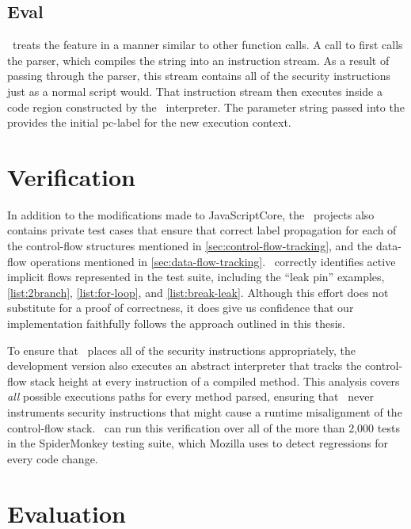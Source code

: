 \subsection{Eval}
\label{sec:eval}
\FlowCore\ treats the  feature in a manner similar to other function calls.
A call to  first calls the parser, which compiles the string into an instruction stream.
As a result of passing through the parser, this stream contains all of the security instructions just as a normal script would.
That instruction stream then executes inside a code region constructed by the \FlowCore\ interpreter.
The parameter string passed into the  provides the initial pc-label for the new execution context.

\section{Verification}

In addition to the modifications made to JavaScriptCore, the \FlowCore\ projects also contains private test cases that ensure that correct label propagation for each of the control-flow structures mentioned in \autoref{sec:control-flow-tracking}, and the data-flow operations mentioned in \autoref{sec:data-flow-tracking}.
\FlowCore\ correctly identifies active implicit flows represented in the test suite, including the ``leak pin'' examples, \autoref{list:2branch}, \autoref{list:for-loop}, and \autoref{list:break-leak}.
Although this effort does not substitute for a proof of correctness, it does give us confidence that our implementation faithfully follows the approach outlined in this thesis.

To ensure that \FlowCore\ places all of the security instructions appropriately, the development version also executes an abstract interpreter that tracks the control-flow stack height at every instruction of a compiled method.
This analysis covers \emph{all} possible executions paths for every method parsed, ensuring that \FlowCore\ never instruments security instructions that might cause a runtime misalignment of the control-flow stack.
\FlowCore\ can run this verification over all of the more than 2,000 tests in the SpiderMonkey testing suite, which Mozilla uses to detect regressions for every code change.


\section{Evaluation}
\label{sec:evaluation}

